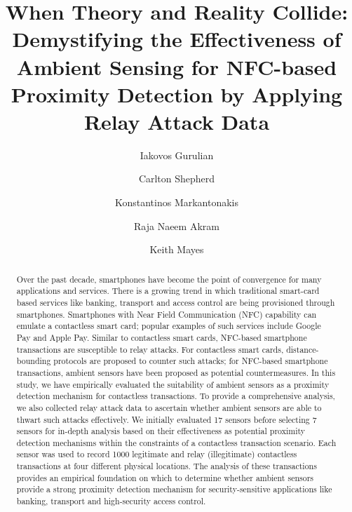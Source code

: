\documentclass[runningheads,a4paper]{llncs}
\begin{document}
\title{When Theory and Reality Collide:  Demystifying the Effectiveness of Ambient Sensing for NFC-based Proximity Detection by Applying Relay Attack Data}

\author{Iakovos Gurulian \and Carlton Shepherd \and
	Konstantinos Markantonakis \and Raja Naeem Akram \and  Keith Mayes}





\maketitle


\begin{abstract}
Over the past decade, smartphones have become the point of convergence for many applications and services. There is a growing trend in which traditional smart-card based services like banking, transport and access control are being provisioned through smartphones. Smartphones with Near Field Communication (NFC) capability can emulate a contactless smart card; popular examples of such services include Google Pay and Apple Pay. Similar to contactless smart cards, NFC-based smartphone transactions are susceptible to relay attacks. For contactless smart cards, distance-bounding protocols are proposed to counter such attacks; for NFC-based smartphone transactions, ambient sensors have been proposed as potential countermeasures. In this study, we have empirically evaluated the suitability of ambient sensors as a proximity detection mechanism for contactless transactions. To provide a comprehensive analysis, we also collected relay attack data to ascertain whether ambient sensors are able to thwart such attacks effectively. We initially evaluated 17 sensors before selecting 7 sensors for in-depth analysis based on their effectiveness as potential proximity detection mechanisms within the constraints of a contactless transaction scenario.  Each sensor was used to record 1000 legitimate and relay (illegitimate) contactless transactions at four different physical locations. The analysis of these transactions provides an empirical foundation on which to determine whether ambient sensors provide a strong proximity detection mechanism for security-sensitive applications like banking, transport and high-security access control.  

\end{abstract}
\end{document}
